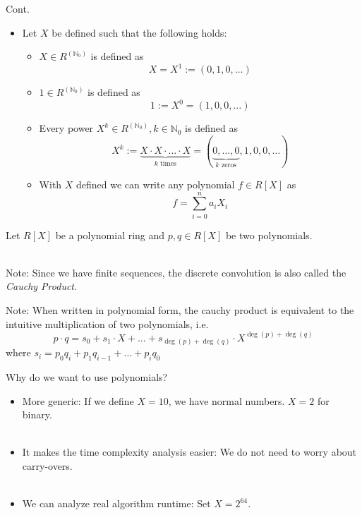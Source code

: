 \documentclass[12pt]{beamer}
\begin{document}
\begin{frame}{}
\begin{block}{Cont.}
\begin{itemize}
\item Let $X$ be defined such that the following holds:
\begin{itemize}
\item $X \in R^{(\mathbb{N}_0)}$ is defined as
\[
X = X^1 := (0,1,0,\dots)
\]
\item $1 \in R^{(\mathbb{N}_0)}$ is defined as
\[
1 := X^0 = (1,0,0,\dots)
\]
\item Every power $X^k \in R^{(\mathbb{N}_0)}, k \in \mathbb{N}_0$ is defined as
\[
X^k := \underbrace{X \cdot X \cdot \dots \cdot X}_{k \text{ times}}
     = (\underbrace{0,\dots,0}_{k \text{ zeros}}, 1, 0,0,\dots)
\]
\item With $X$ defined we can write any polynomial $f \in R[X]$ as
\[
f = \sum_{i=0}^n a_i X_i
\]
\end{itemize}
\end{itemize}
\end{block}
\end{frame}

\begin{frame}{}
Let $R[X]$ be a polynomial ring and $p,q \in R[X]$ be two polynomials.
\\~\\
\begin{block}{Note:}
Since we have finite sequences, the discrete convolution is also called the \emph{Cauchy Product}.
\end{block}
\pause
\begin{block}{Note:}
When written in polynomial form, the cauchy product is equivalent to the intuitive multiplication of two polynomials,
i.e.
\[
p \cdot q = s_0 + s_1 \cdot X + \dots + s_{\deg(p)+\deg(q)}\cdot X^{\deg(p)+\deg(q)}
\]
where $s_i = p_0q_i + p_1 q_{i-1} + \dots + p_i q_0$
\end{block}
\end{frame}

\begin{frame}{Why do we want to use polynomials?}
\begin{itemize}
\item More generic: If we define $X = 10$, we have normal numbers. $X=2$ for binary.
\\~\\
\pause
\item It makes the time complexity analysis easier: We do not need to worry about carry-overs.
\\~\\
\pause
\item We can analyze real algorithm runtime: Set $X = 2^{64}$.
\end{itemize}
\end{frame}
\end{document}
